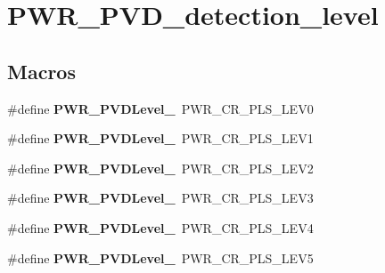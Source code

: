 \hypertarget{group___p_w_r___p_v_d__detection__level}{\section{P\-W\-R\-\_\-\-P\-V\-D\-\_\-detection\-\_\-level}
\label{group___p_w_r___p_v_d__detection__level}
}
\subsection*{Macros}
\begin{DoxyCompactItemize}
\item 
\hypertarget{group___p_w_r___p_v_d__detection__level_gac8ec8a52046b242f03dcf8a4f32fb04b}{\#define {\bfseries P\-W\-R\-\_\-\-P\-V\-D\-Level\-\_}~P\-W\-R\-\_\-\-C\-R\-\_\-\-P\-L\-S\-\_\-\-L\-E\-V0}\label{group___p_w_r___p_v_d__detection__level_gac8ec8a52046b242f03dcf8a4f32fb04b}

\item 
\hypertarget{group___p_w_r___p_v_d__detection__level_ga0d090f9683877c0e8a5546a56d5ad888}{\#define {\bfseries P\-W\-R\-\_\-\-P\-V\-D\-Level\-\_}~P\-W\-R\-\_\-\-C\-R\-\_\-\-P\-L\-S\-\_\-\-L\-E\-V1}\label{group___p_w_r___p_v_d__detection__level_ga0d090f9683877c0e8a5546a56d5ad888}

\item 
\hypertarget{group___p_w_r___p_v_d__detection__level_gabaccdd03ff6fbfa16e6a1283a2e6b989}{\#define {\bfseries P\-W\-R\-\_\-\-P\-V\-D\-Level\-\_}~P\-W\-R\-\_\-\-C\-R\-\_\-\-P\-L\-S\-\_\-\-L\-E\-V2}\label{group___p_w_r___p_v_d__detection__level_gabaccdd03ff6fbfa16e6a1283a2e6b989}

\item 
\hypertarget{group___p_w_r___p_v_d__detection__level_gabbd91e2587a81908837b0a759694fba9}{\#define {\bfseries P\-W\-R\-\_\-\-P\-V\-D\-Level\-\_}~P\-W\-R\-\_\-\-C\-R\-\_\-\-P\-L\-S\-\_\-\-L\-E\-V3}\label{group___p_w_r___p_v_d__detection__level_gabbd91e2587a81908837b0a759694fba9}

\item 
\hypertarget{group___p_w_r___p_v_d__detection__level_ga81f75ef83b2aa4b0f23f75b01ae6afcf}{\#define {\bfseries P\-W\-R\-\_\-\-P\-V\-D\-Level\-\_}~P\-W\-R\-\_\-\-C\-R\-\_\-\-P\-L\-S\-\_\-\-L\-E\-V4}\label{group___p_w_r___p_v_d__detection__level_ga81f75ef83b2aa4b0f23f75b01ae6afcf}

\item 
\hypertarget{group___p_w_r___p_v_d__detection__level_ga0dfeb8ca4a8cb68dd99b1fe087c9440a}{\#define {\bfseries P\-W\-R\-\_\-\-P\-V\-D\-Level\-\_}~P\-W\-R\-\_\-\-C\-R\-\_\-\-P\-L\-S\-\_\-\-L\-E\-V5}\label{group___p_w_r___p_v_d__detection__level_ga0dfeb8ca4a8cb68dd99b1fe087c9440a}


\end{DoxyCompactItemize}
